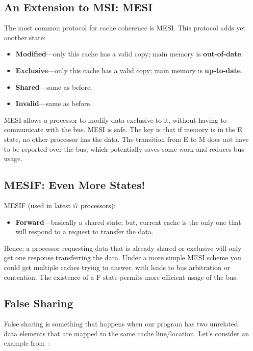 \documentclass[a4paper]{report}
\begin{document}
\subsection*{An Extension to MSI: MESI}
    The most common protocol for cache coherence is MESI.
    This protocol adds yet another state:
      \begin{itemize}
        \item {\bf Modified}---only this cache has a valid copy; 
 main memory is {\bf out-of-date}.
        \item {\bf Exclusive}---only this cache has a valid copy; 
 main memory is {\bf up-to-date}.
        \item {\bf Shared}---same as before.
        \item {\bf Invalid}---same as before.
      \end{itemize}

    MESI allows a processor to modify data exclusive to it, without
    having to communicate with the bus.  MESI is safe. The key is that
    if memory is in the E state, no other processor has the data. The transition from E to M does not have to be reported over the bus, which potentially saves some work and reduces bus usage. 

\subsection*{MESIF: Even More States!}

    MESIF (used in latest i7 processors):
      \begin{itemize}
        \item {\bf Forward}---basically a shared state; but, current
          cache is the only one that will respond to a request to
          transfer the data.
      \end{itemize}

    Hence: a processor requesting data that is already shared or exclusive will
      only get one response transferring the data. Under a more simple MESI scheme you could get multiple caches trying to answer, with leads to bus arbitration or contention. The existence of a F state permits more efficient usage of the bus.
      
      
\subsection*{False Sharing}
False sharing is something that happens when our program has two unrelated data elements that are mapped to the same cache line/location. Let's consider an example from~\cite{falsesharing}:
\end{document}
